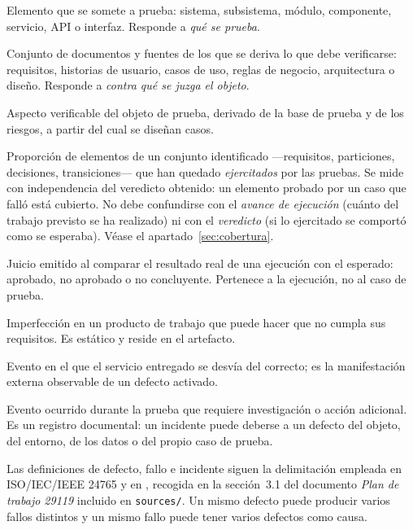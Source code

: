 \begin{description}[style=nextline,leftmargin=2.6cm,labelwidth=2.4cm,font=\bfseries]
  \item[Objeto de prueba] Elemento que se somete a prueba: sistema, subsistema, módulo,
        componente, servicio, API o interfaz. Responde a \emph{qué se prueba}.
  \item[Base de prueba] Conjunto de documentos y fuentes de los que se deriva lo que debe
        verificarse: requisitos, historias de usuario, casos de uso, reglas de negocio,
        arquitectura o diseño. Responde a \emph{contra qué se juzga el objeto}.
  \item[Condición de prueba] Aspecto verificable del objeto de prueba, derivado de la base de
        prueba y de los riesgos, a partir del cual se diseñan casos.
  \item[Cobertura] Proporción de elementos de un conjunto identificado —requisitos,
        particiones, decisiones, transiciones— que han quedado \emph{ejercitados} por las
        pruebas. Se mide con independencia del veredicto obtenido: un elemento probado por un
        caso que falló está cubierto. No debe confundirse con el \emph{avance de ejecución}
        (cuánto del trabajo previsto se ha realizado) ni con el \emph{veredicto} (si lo
        ejercitado se comportó como se esperaba). Véase el apartado~\ref{sec:cobertura}.
  \item[Veredicto] Juicio emitido al comparar el resultado real de una ejecución con el
        esperado: aprobado, no aprobado o no concluyente. Pertenece a la ejecución, no al caso
        de prueba.
  \item[Defecto] Imperfección en un producto de trabajo que puede hacer que no cumpla sus
        requisitos. Es estático y reside en el artefacto.
  \item[Fallo] Evento en el que el servicio entregado se desvía del correcto; es la
        manifestación externa observable de un defecto activado.
  \item[Incidente de prueba] Evento ocurrido durante la prueba que requiere investigación o
        acción adicional. Es un registro documental: un incidente puede deberse a un defecto
        del objeto, del entorno, de los datos o del propio caso de prueba.
  \item[\campo{Término del dominio}] 
\end{description}

\begin{notanormativa}
Las definiciones de defecto, fallo e incidente siguen la delimitación empleada en
ISO/IEC/IEEE 24765 y en , recogida en la sección~3.1 del documento
\emph{Plan de trabajo 29119} incluido en \texttt{sources/}. Un mismo defecto puede producir
varios fallos distintos y un mismo fallo puede tener varios defectos como causa.
\end{notanormativa}
